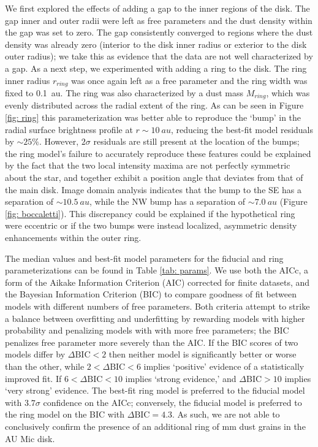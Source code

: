 \documentclass[modern]{aastex62}
\begin{document}
We first explored the effects of adding a gap  to the inner regions of the disk. 
The gap inner and outer radii were left as free parameters and the dust density within the gap was set to zero.
The gap consistently converged to regions where the dust density was already zero (interior to the disk inner radius or exterior to the disk outer radius); we take this as evidence that the data are not well characterized by a gap.
As a next step, we experimented with adding a ring to the disk.
The ring inner radius $r_{ring}$ was once again left as a free parameter and the ring width was fixed to \SI{0.1}{au}.
The ring was also characterized by a dust mass $M_{ring}$, which was evenly distributed across the radial extent of the ring. 
As can be seen in Figure \ref{fig: ring} this parameterization was better able to reproduce the `bump' in the radial surface brightness profile at $r \sim \SI{10}{au}$, reducing the best-fit model residuals by $\sim 25 \%$. 
However, $2 \sigma$ residuals are still present at the location of the bumps; the ring model's failure to accurately reproduce these features could be explained by the fact that the two local intensity maxima are not perfectly symmetric about the star, and together exhibit a position angle that deviates from that of the main disk. 
Image domain analysis indicates that the bump to the SE has a separation of $\sim \SI{10.5}{au}$, while the NW bump has a separation of $\sim \SI{7.0}{au}$ (Figure \ref{fig: boccaletti}). 
This discrepancy could be explained if the hypothetical ring were eccentric or if the two bumps were instead localized, asymmetric density enhancements within the outer ring.

The median values and best-fit model parameters for the fiducial and ring parameterizations can be found in Table \ref{tab: params}. 
We use both the AICc, a form of the Aikake Information Criterion (AIC) corrected for finite datasets, and the Bayesian Information Criterion (BIC) to compare goodness of fit between models with different numbers of free parameters.  
Both criteria attempt to strike a balance between overfitting and underfitting by rewarding models with higher probability and penalizing models with with more free parameters; the BIC penalizes free parameter more severely than the AIC.
If the BIC scores of two models differ by $\Delta \text{BIC} < 2$ then neither model is significantly better or worse than the other, while $2 < \Delta \text{BIC} < 6$ implies `positive' evidence of a statistically improved fit.
If  $6 < \Delta \text{BIC} < 10$ implies `strong evidence,' and $ \Delta \text{BIC} > 10$ implies `very strong' evidence.
The best-fit ring model is preferred to the fiducial model with $3.7 \sigma$ confidence on the AICc; conversely, the fiducial model is preferred to the ring model on the BIC with $\Delta \text{BIC} = 4.3$.
As such, we are not able to conclusively confirm the presence of an additional ring of mm dust grains in the AU Mic disk.
\end{document}
